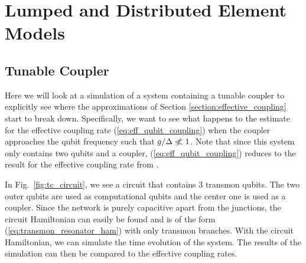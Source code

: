 
\section{Lumped and Distributed Element Models}
\subsection{Tunable Coupler}
Here we will look at a simulation of a system containing a tunable coupler \cite{tunable_coupler} to explicitly see where the approximations of Section \ref{section:effective_coupling} start to break down. Specifically, we want to see what happens to the estimate for the effective coupling rate (\ref{eq:eff_qubit_coupling}) when the coupler approaches the qubit frequency such that $g/\Delta \centernot{\ll} 1$. Note that since this system only contains two qubits and a coupler, (\ref{eq:eff_qubit_coupling}) reduces to the result for the effective coupling rate from \cite{tunable_coupler}.

In Fig.\ \ref{fig:tc_circuit}, we see a circuit that contains 3 transmon qubits. The two outer qubits are used as computational qubits and the center one is used as a coupler. Since the network is purely capacitive apart from the junctions, the circuit Hamiltonian can easily be found and is of the form (\ref{eq:transmon_resonator_ham}) with only transmon branches. With the circuit Hamiltonian, we can simulate the time evolution of the system. The results of the simulation can then be compared to the effective coupling rates.

